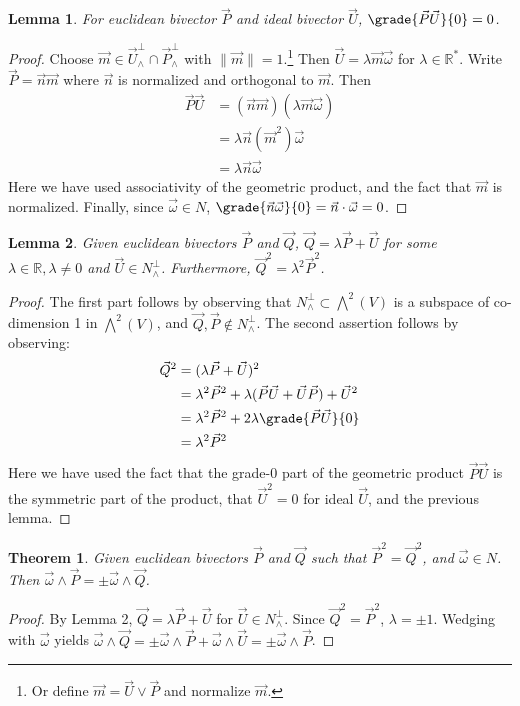 \documentclass{birkjour}
\newtheorem{mythm}{Theorem}
\newtheorem{mylemma}{Lemma}
\begin{document}
\begin{mylemma}
For euclidean bivector $\vec{P}$ and ideal bivector $\vec{U}$, $ \grade{\vec{P}\vec{U}}{0} = 0$.
\end{mylemma}
\begin{proof}
Choose $\vec{m} \in \vec{U}^{\perp}_{\wedge} \cap \vec{P}^{\perp}_{\wedge}$ with $\| \vec{m} \| = 1$.\footnote{Or define $\vec{m} = \vec{U} \vee \vec{P}$ and normalize $\vec{m}$.}  Then $\vec{U} =  \lambda \vec{m} \vec{\omega} $ for $\lambda \in \mathbb{R}^{*}$. Write $\vec{P} =  \vec{n}\vec{m}$ where $\vec{n}$ is normalized and orthogonal to $\vec{m}$.  Then
\begin{align*}
{\vec{P}\vec{U}}&={(\vec{n}\vec{m})(\lambda\vec{m}\vec{\omega})} \\
&=  \lambda{\vec{n}(\vec{m}^{2})\vec{\omega}} \\
&=  \lambda{\vec{n}\vec{\omega}} 
\end{align*}
Here we have used associativity of the geometric product, and the fact that $\vec{m}$ is normalized.  Finally, since $\vec{\omega} \in N$,   $\grade{\vec{n}\vec{\omega}}{0}  = \vec{n} \cdot \vec{\omega} = 0$.
\end{proof}
\begin{mylemma}
Given  euclidean bivectors $\vec{P}$ and $\vec{Q}$, $\vec{Q}  = \lambda \vec{P} + \vec{U}$ for some $ \lambda \in \mathbb{R}, \lambda \neq 0$ and $\vec{U} \in N_{\wedge}^{\perp}$. Furthermore, $\vec{Q}^{2} = \lambda^{2}\vec{P}^{2}$.
\end{mylemma}
\begin{proof}
The first part follows by observing that $N^{\perp}_{\wedge} \subset \bigwedge^{2}(V)$ is a subspace of co-dimension 1 in $\bigwedge^{2}(V)$, and $\vec{Q}, \vec{P} \notin N^{\perp}_{\wedge} $. The second assertion follows by observing:
\begin{align*}
\vec{Q}^{2} &= (\lambda \vec{P} + \vec{U})^{2}\\
&=\lambda^{2} \vec{P}^{2} + \lambda(\vec{P}\vec{U} + \vec{U}\vec{P}) + \vec{U}^{2}\\
&=\lambda^{2}  \vec{P}^{2} + 2 \lambda \grade{\vec{P}\vec{U}}{0} \\
&= \lambda^{2} \vec{P}^{2}
\end{align*} 
Here we have used the fact that the grade-0 part of the geometric product $ \vec{P}\vec{U}$ is the symmetric part of the product, that $\vec{U}^{2}=0$ for ideal $\vec{U}$, and the previous lemma.  
\end{proof}
\begin{mythm}
Given euclidean bivectors $\vec{P}$ and $\vec{Q}$ such that $\vec{P}^{2} = \vec{Q}^{2}$, and $\vec{\omega} \in N$. Then $\vec{\omega} \wedge \vec{P}=\pm \vec{\omega} \wedge \vec{Q}$.  
\end{mythm}
\begin{proof}
By Lemma 2, $\vec{Q} = \lambda \vec{P} + \vec{U}$ for $\vec{U} \in N_{\wedge}^{\perp}$.  Since $\vec{Q}^{2} = \vec{P}^{2}$, $\lambda = \pm 1$.  Wedging with $\vec{\omega}$ yields $\vec{\omega}\wedge \vec{Q} = \pm \vec{\omega} \wedge \vec{P} + \vec{\omega} \wedge \vec{U} = \pm \vec{\omega} \wedge \vec{P}$.
\end{proof}
\end{document}
